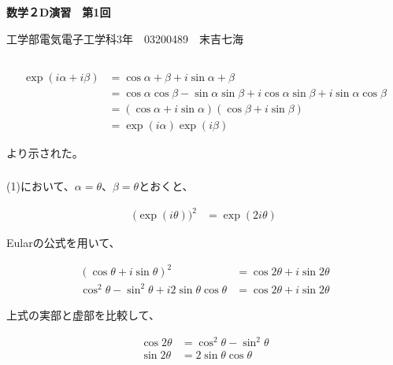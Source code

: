 \documentclass[dvipdfmx,a4paper]{jsarticle}
\begin{document}
\begin{center}
\textbf{\huge{数学２D演習　第1回}}
\end{center}

\begin{flushright}
工学部電気電子工学科3年　03200489　末吉七海\\
\end{flushright}

\subsection{}

\subsubsection{}

\begin{align*}
\exp{(i\alpha + i\beta)} &= \cos{\alpha + \beta} + i\sin{\alpha + \beta} \\
&= \cos{\alpha} \cos{\beta} - \sin{\alpha} \sin{\beta} + i\cos{\alpha} \sin{\beta} + i\sin{\alpha} \cos{\beta} \\
&=(\cos{\alpha} + i\sin{\alpha})(\cos{\beta} + i\sin{\beta}) \\
&=\exp{(i\alpha)} \exp{(i\beta)}
\end{align*}

より示された。

\subsubsection{}

(1)において、$\alpha = \theta$、$\beta = \theta$とおくと、

\begin{align*}
\bigl(\exp{(i\theta)}\bigr)^2 &= \exp{(2i\theta)}
\end{align*}

Eularの公式を用いて、

\begin{align*}
(\cos{\theta} + i\sin{\theta})^2 &= \cos{2\theta} + i\sin{2\theta} \\
\cos^{2}\theta - \sin^{2}\theta + i2\sin{\theta} \cos{\theta} &= \cos{2\theta} + i\sin{2\theta}
\end{align*}

上式の実部と虚部を比較して、

\begin{align*}
\cos{2\theta} &= \cos^{2}\theta - \sin^{2}\theta\\
\sin{2\theta} &= 2\sin{\theta} \cos{\theta}
\end{align*}
\end{document}
